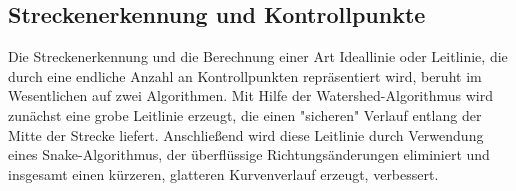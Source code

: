 \documentclass[11pt,final,journal,a4paper,towside,towcolumn]{IEEEtran}
\begin{document}


\subsection{Streckenerkennung und Kontrollpunkte}
Die Streckenerkennung und die Berechnung einer Art Ideallinie oder Leitlinie, die durch eine endliche Anzahl an Kontrollpunkten repräsentiert wird, beruht im Wesentlichen auf zwei Algorithmen. Mit Hilfe der Watershed-Algorithmus wird zunächst eine grobe Leitlinie erzeugt, die einen "sicheren" Verlauf entlang der Mitte der Strecke liefert. Anschließend wird diese Leitlinie durch Verwendung eines Snake-Algorithmus, der überflüssige Richtungsänderungen eliminiert und insgesamt einen kürzeren, glatteren Kurvenverlauf erzeugt, verbessert.
\end{document}
